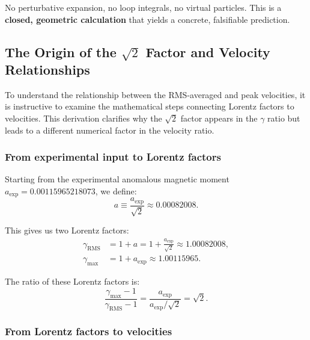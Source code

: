 \documentclass[12pt,letterpaper]{article}
\begin{document}
No perturbative expansion, no loop integrals, no virtual particles. This is a \textbf{closed, geometric calculation} that yields a concrete, falsifiable prediction.

\subsection{The Origin of the $\sqrt{2}$ Factor and Velocity Relationships}

To understand the relationship between the RMS-averaged and peak velocities, it is instructive to examine the mathematical steps connecting Lorentz factors to velocities. This derivation clarifies why the $\sqrt{2}$ factor appears in the $\gamma$ ratio but leads to a different numerical factor in the velocity ratio.

\subsubsection{From experimental input to Lorentz factors}

Starting from the experimental anomalous magnetic moment $a_{\mathrm{exp}} = 0.00115965218073$, we define:
\begin{equation}
a \equiv \frac{a_{\mathrm{exp}}}{\sqrt{2}} \approx 0.00082008.
\end{equation}

This gives us two Lorentz factors:
\begin{align}
\gamma_{\mathrm{RMS}} &= 1 + a = 1 + \frac{a_{\mathrm{exp}}}{\sqrt{2}} \approx 1.00082008, \\
\gamma_{\max} &= 1 + a_{\mathrm{exp}} \approx 1.00115965.
\end{align}

The ratio of these Lorentz factors is:
\begin{equation}
\frac{\gamma_{\max} - 1}{\gamma_{\mathrm{RMS}} - 1} = \frac{a_{\mathrm{exp}}}{a_{\mathrm{exp}}/\sqrt{2}} = \sqrt{2}.
\end{equation}

\subsubsection{From Lorentz factors to velocities}
\end{document}
